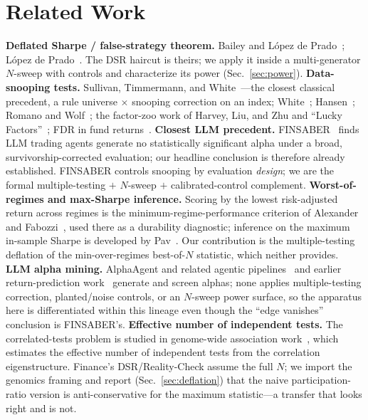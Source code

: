 \documentclass[sigconf,review,anonymous]{acmart}
\begin{document}
\section{Related Work}
\textbf{Deflated Sharpe / false-strategy theorem.} Bailey and L\'opez de Prado~\cite{bailey2014dsr,bailey2016pbo}; L\'opez de Prado~\cite{lopezdeprado2018}. The DSR haircut is theirs; we apply it inside a multi-generator $N$-sweep with controls and characterize its power (Sec.~\ref{sec:power}).
\textbf{Data-snooping tests.} Sullivan, Timmermann, and White~\cite{stw1999}---the closest classical precedent, a rule universe $\times$ snooping correction on an index; White~\cite{white2000}; Hansen~\cite{hansen2005}; Romano and Wolf~\cite{romanowolf2005}; the factor-zoo work of Harvey, Liu, and Zhu and ``Lucky Factors''~\cite{harvey2016,harveyliu2021}; FDR in fund returns~\cite{barras2010}.
\textbf{Closest LLM precedent.} FINSABER~\cite{finsaber2026} finds LLM trading agents generate no statistically significant alpha under a broad, survivorship-corrected evaluation; our headline conclusion is therefore already established. FINSABER controls snooping by evaluation \emph{design}; we are the formal multiple-testing $+$ $N$-sweep $+$ calibrated-control complement.
\textbf{Worst-of-regimes and max-Sharpe inference.} Scoring by the lowest risk-adjusted return across regimes is the minimum-regime-performance criterion of Alexander and Fabozzi~\cite{alexander2026mrp}, used there as a durability diagnostic; inference on the maximum in-sample Sharpe is developed by Pav~\cite{pav2019}. Our contribution is the multiple-testing deflation of the min-over-regimes best-of-$N$ statistic, which neither provides.
\textbf{LLM alpha mining.} AlphaAgent and related agentic pipelines~\cite{alphaagent2025} and earlier return-prediction work~\cite{lopezlira2023} generate and screen alphas; none applies multiple-testing correction, planted/noise controls, or an $N$-sweep power surface, so the apparatus here is differentiated within this lineage even though the ``edge vanishes'' conclusion is FINSABER's.
\textbf{Effective number of independent tests.} The correlated-tests problem is studied in genome-wide association work~\cite{nyholt2004,galwey2009}, which estimates the effective number of independent tests from the correlation eigenstructure. Finance's DSR/Reality-Check assume the full $N$; we import the genomics framing and report (Sec.~\ref{sec:deflation}) that the naive participation-ratio version is anti-conservative for the maximum statistic---a transfer that looks right and is not.
\end{document}
